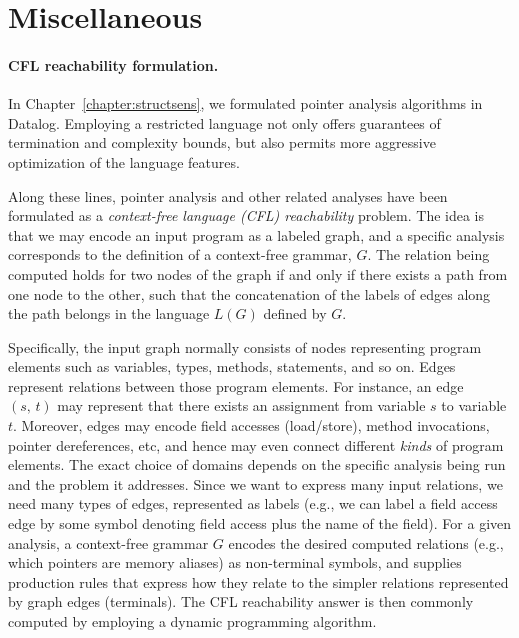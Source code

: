 \section{Miscellaneous}
\label{related:sect/misc}


\paragraph{CFL reachability formulation.} In
Chapter~\ref{chapter:structsens}, we formulated pointer analysis
algorithms in Datalog. Employing a restricted language not only offers
guarantees of termination and complexity bounds, but also permits more
aggressive optimization of the language features.

Along these lines, pointer analysis and other related analyses have
been formulated as a \emph{context-free language (CFL) reachability}
problem. The idea is that we may encode an input program as a labeled
graph, and a specific analysis corresponds to the definition of a
context-free grammar, \(G\). The relation being computed holds for two
nodes of the graph if and only if there exists a path from one node to
the other, such that the concatenation of the labels of edges along
the path belongs in the language \(L(G)\) defined by \(G\).

Specifically, the input graph normally consists of nodes representing
program elements such as variables, types, methods, statements, and so
on. Edges represent relations between those program elements. For
instance, an edge \((s,\,t)\) may represent that there exists an
assignment from variable \(s\) to variable \(t\). Moreover, edges may
encode field accesses (load/store), method invocations, pointer
dereferences, etc, and hence may even connect different \emph{kinds}
of program elements. The exact choice of domains depends on the
specific analysis being run and the problem it addresses. Since we
want to express many input relations, we need many types of edges,
represented as labels (e.g., we can label a field access edge by some
symbol denoting field access plus the name of the field).  For a given
analysis, a context-free grammar \(G\) encodes the desired computed
relations (e.g., which pointers are memory aliases) as non-terminal
symbols, and supplies production rules that express how they relate to
the simpler relations represented by graph edges (terminals). The CFL
reachability answer is then commonly computed by employing a dynamic
programming algorithm.

